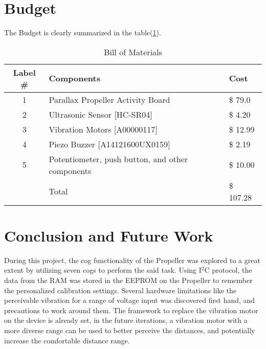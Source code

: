 \documentclass[twoside,11pt,letter]{article}
\begin{document}
\section{Budget}
The Budget is clearly summarized in the table(\ref{tab:BOM}).

\begin{table}[h]
    \centering
    \begin{tabular}{|c|p{8cm}|l|}    \hline
    \textbf{Label} \#      &\textbf{Components}                     &\textbf{Cost}      \\\hline \hline
        1       &Parallax Propeller Activity Board                  &\$ 79.0            \\ \hline
        2       &Ultrasonic Sensor [HC-SR04]                        &\$ 4.20            \\ \hline
        3       &Vibration Motors [A00000117]                       &\$ 12.99           \\ \hline
        4       &Piezo Buzzer [A14121600UX0159]                     &\$ 2.19            \\ \hline
        5       &Potentiometer, push button, and other components   &\$ 10.00           \\ \hline \hline
                &Total                                              &\$ 107.28          \\ \hline
    \end{tabular}
    \caption{Bill of Materials}
    \label{tab:BOM}
    
\end{table}

\section{Conclusion and Future Work}
During this project, the cog functionality of the Propeller was explored to a great extent by utilizing seven cogs to perform the said task. Using I$^2$C protocol, the data from the RAM was stored in the EEPROM on the Propeller to remember the personalized calibration settings. Several hardware limitations like the perceivable vibration for a range of voltage input was discovered first hand, and precautions to work around them. The framework to replace the vibration motor on the device is already set, in the future iterations, a vibration motor with a more diverse range can be used to better perceive the distances, and potentially increase the comfortable distance range.  

\clearpage
\end{document}
